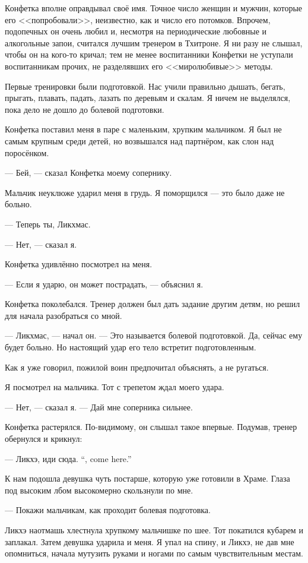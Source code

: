 Конфетка вполне оправдывал своё имя. Точное число женщин и мужчин, которые его <<попробовали>>, неизвестно, как и число его потомков.
Впрочем, подопечных он очень любил и, несмотря на периодические любовные и алкогольные запои, считался лучшим тренером в Тхитроне.
Я ни разу не слышал, чтобы он на кого-то кричал;
тем не менее воспитанники Конфетки не уступали воспитанникам прочих, не разделявших его <<миролюбивые>> методы.

Первые тренировки были подготовкой.
Нас учили правильно дышать, бегать, прыгать, плавать, падать, лазать по деревьям и скалам.
Я ничем не выделялся, пока дело не дошло до болевой подготовки.

Конфетка поставил меня в паре с маленьким, хрупким мальчиком.
Я был не самым крупным среди детей, но возвышался над партнёром, как слон над поросёнком.

--- Бей, --- сказал Конфетка моему сопернику.

Мальчик неуклюже ударил меня в грудь.
Я поморщился --- это было даже не больно.

--- Теперь ты, Ликхмас.

--- Нет, --- сказал я.

Конфетка удивлённо посмотрел на меня.

--- Если я ударю, он может пострадать, --- объяснил я.

Конфетка поколебался.
Тренер должен был дать задание другим детям, но решил для начала разобраться со мной.

--- Ликхмас, --- начал он.
--- Это называется болевой подготовкой.
Да, сейчас ему будет больно.
Но настоящий удар его тело встретит подготовленным.

Как я уже говорил, пожилой воин предпочитал объяснять, а не ругаться.

Я посмотрел на мальчика.
Тот с трепетом ждал моего удара.

--- Нет, --- сказал я. --- Дай мне соперника сильнее.

Конфетка растерялся.
По-видимому, он слышал такое впервые.
Подумав, тренер обернулся и крикнул:

{--- Ликхэ, иди сюда.}
{``\Likchoe, come here.''}

К нам подошла девушка чуть постарше, которую уже готовили в Храме.
Глаза под высоким лбом высокомерно скользнули по мне.

--- Покажи мальчикам, как проходит болевая подготовка.

Ликхэ наотмашь хлестнула хрупкому мальчишке по шее.
Тот покатился кубарем и заплакал.
Затем девушка ударила и меня.
Я упал на спину, и Ликхэ, не дав мне опомниться, начала мутузить руками и ногами по самым чувствительным местам.

